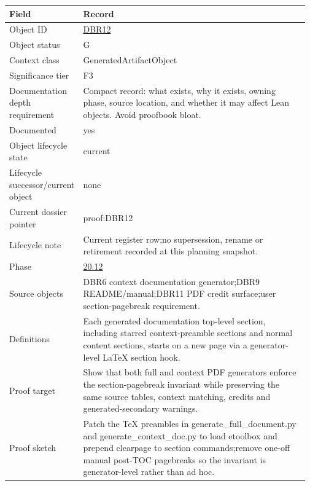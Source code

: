\begin{longtable}{L{0.16\linewidth} L{0.81\linewidth}}
\hline
\textbf{Field} & \textbf{Record}\\
\hline
Object ID & \hyperlink{object-row-DBR12}{DBR12}\\
\hline\addlinespace[0.20em]
Object status & G\\
\hline\addlinespace[0.20em]
Context class & GeneratedArtifactObject\\
\hline\addlinespace[0.20em]
Significance tier & F3\\
\hline\addlinespace[0.20em]
Documentation depth requirement & Compact record: what exists, why it exists, owning phase, source location, and whether it may affect Lean objects. Avoid proofbook bloat.\\
\hline\addlinespace[0.20em]
Documented & yes\\
\hline\addlinespace[0.20em]
Object lifecycle state & current\\
\hline\addlinespace[0.20em]
Lifecycle successor/\allowbreak{}current object & none\\
\hline\addlinespace[0.20em]
Current dossier pointer & proof:DBR12\\
\hline\addlinespace[0.20em]
Lifecycle note & Current register row;\newline no supersession, rename or retirement recorded at this planning snapshot.\\
\hline\addlinespace[0.20em]
Phase & \hyperlink{phase-row-20-12}{20.12}\\
\hline\addlinespace[0.20em]
Source objects & DBR6 context documentation generator;\newline DBR9 README/\allowbreak{}manual;\newline DBR11 PDF credit surface;\newline user section-pagebreak requirement.\\
\hline\addlinespace[0.20em]
Definitions & Each generated documentation top-level section, including starred context-preamble sections and normal content sections, starts on a new page via a generator-level LaTeX section hook.\\
\hline\addlinespace[0.20em]
Proof target & Show that both full and context PDF generators enforce the section-pagebreak invariant while preserving the same source tables, context matching, credits and generated-secondary warnings.\\
\hline\addlinespace[0.20em]
Proof sketch & Patch the TeX preambles in generate\_full\_document.py and generate\_context\_doc.py to load etoolbox and prepend clearpage to section commands;\newline remove one-off manual post-TOC pagebreaks so the invariant is generator-level rather than ad hoc.\\

\end{longtable}
